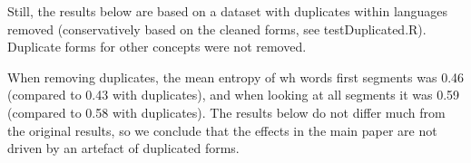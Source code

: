 \documentclass[10pt,a4paper,landscape]{article}
\begin{document}
Still, the results below are based on a dataset with duplicates within languages removed (conservatively based on the cleaned forms, see testDuplicated.R).  Duplicate forms for other concepts were not removed.  

When removing duplicates, the mean entropy of wh words first segments was 0.46 (compared to 0.43 with duplicates), and when looking at all segments it was 0.59 (compared to 0.58 with duplicates).  The results below do not differ much from the original results, so we conclude that the effects in the main paper are not driven by an artefact of duplicated forms. 








\end{document}
